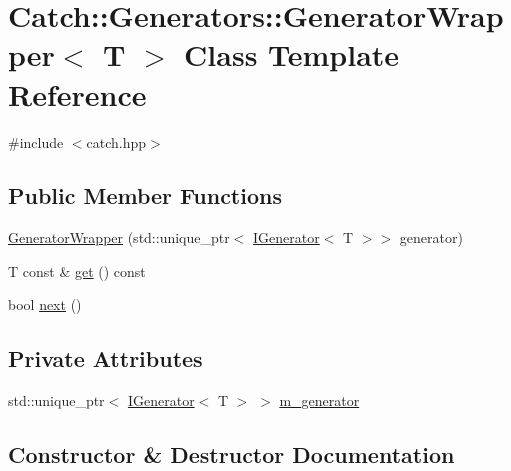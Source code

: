 \hypertarget{class_catch_1_1_generators_1_1_generator_wrapper}{}\section{Catch\+::Generators\+::Generator\+Wrapper$<$ T $>$ Class Template Reference}
\label{class_catch_1_1_generators_1_1_generator_wrapper}


{\ttfamily \#include $<$catch.\+hpp$>$}

\subsection*{Public Member Functions}
\begin{DoxyCompactItemize}
\item 
\mbox{\hyperlink{class_catch_1_1_generators_1_1_generator_wrapper_aecffeafd4fd38d91a52dadf28b6e2b29}{Generator\+Wrapper}} (std\+::unique\+\_\+ptr$<$ \mbox{\hyperlink{struct_catch_1_1_generators_1_1_i_generator}{I\+Generator}}$<$ T $>$$>$ generator)
\item 
T const  \& \mbox{\hyperlink{class_catch_1_1_generators_1_1_generator_wrapper_a271f0f905f2c473c907550435b81e102}{get}} () const
\item 
bool \mbox{\hyperlink{class_catch_1_1_generators_1_1_generator_wrapper_acbfdca94811ae02461bd2cf5f60b666e}{next}} ()
\end{DoxyCompactItemize}
\subsection*{Private Attributes}
\begin{DoxyCompactItemize}
\item 
std\+::unique\+\_\+ptr$<$ \mbox{\hyperlink{struct_catch_1_1_generators_1_1_i_generator}{I\+Generator}}$<$ T $>$ $>$ \mbox{\hyperlink{class_catch_1_1_generators_1_1_generator_wrapper_a8f35291599183b36e4c5af78e17d3a8c}{m\+\_\+generator}}
\end{DoxyCompactItemize}


\subsection{Constructor \& Destructor Documentation}
\mbox{\label{class_catch_1_1_generators_1_1_generator_wrapper_aecffeafd4fd38d91a52dadf28b6e2b29}} 
